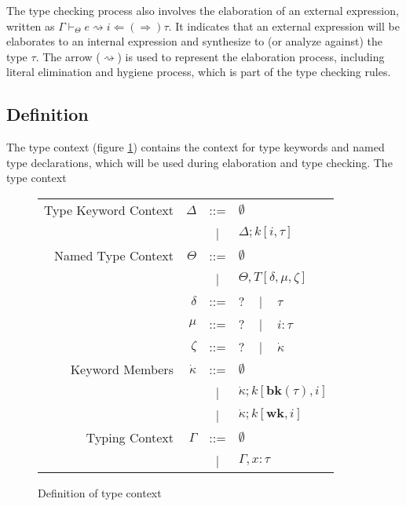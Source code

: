 \documentclass{sig-alternate}
\newcommand{\mycaption}[1]{\vspace{-4px}\caption{#1}\vspace{-2px}}
\begin{document}
The type checking process also involves the elaboration of an external expression, written as $\Gamma\vdash_{\Theta} e\rightsquigarrow i \Leftarrow(\Rightarrow) \tau$. It indicates that an external expression will be elaborates to an internal expression and synthesize to (or analyze against) the type $\tau$. The arrow ($\rightsquigarrow$) is used to represent the elaboration process, including literal elimination and hygiene process, which is part of the type checking rules.

\subsection{ Definition}
The type context (figure \ref{typechecking-environment}) contains the context for type keywords and named type declarations, which will be used during elaboration and type checking. The type context 

\begin{figure}[ht]
\begin{center}
\begin{tabular}{r r c l}
Type Keyword Context & $\Delta$ & ::= & $\emptyset$\\
              &                 &  |  & $\Delta;k[i,\tau]$\\
Named Type Context  & $\Theta$        & ::= & $\emptyset$\\
              &                 &  |  & $\Theta,T[\delta,\mu,\zeta]$\\
              & $\delta$        & ::= & $?$ ~ | ~ $\tau$\\
   & $\mu$           & ::= & $?$ ~ | ~ $i:\tau$\\
   & $\zeta$         & ::= & $?$ ~ | ~ $\dot\kappa$\\
Keyword Members & $\dot\kappa$    & ::= & $\emptyset$\\
            &                 &   |  & $\dot\kappa;k[\mathbf{bk}(\tau),i]$\\
            &                 &   |  & $\dot\kappa;k[\mathbf{wk},i]$\\
Typing Context & $\Gamma$ &   ::=  & $\emptyset$\\
                 &          &     |  & $\Gamma,x:\tau$
\end{tabular}
\end{center}
\mycaption{Definition of type context}
\label{typechecking-environment}
\end{figure}
\end{document}
